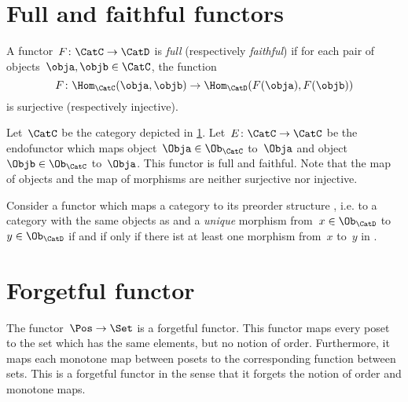 

\section{Full and faithful functors}
\begin{ctdefinition}
    \label{def:functorfullfaith}
    A functor~$F\colon \CatC \to \CatD$ is \emph{full} (respectively \emph{faithful}) if for each pair of objects~$\obja,\objb\in \CatC$, the function
    \begin{equation}
        F\colon \Hom_\CatC(\obja,\objb)\to \Hom_\CatD(F(\obja),F(\objb))
    \end{equation}
    is surjective (respectively injective).
\end{ctdefinition}

\begin{example}
    Let~$\CatC$ be the category depicted in \cref{fig:ex_full_faithful_1}. Let~$E\colon \CatC\to \CatC$ be the endofunctor which maps object~$\Obja\in \Ob_{\CatC}$ to~$\Obja$ and object~$\Objb\in \Ob_{\CatC}$ to~$\Obja$. This functor is full and faithful. Note that the map of objects and the map of morphisms are neither surjective nor injective.

    \begin{figure}[h!]
        \centering
        \caption{\label{fig:ex_full_faithful_1}}
    \end{figure}
\end{example}

\begin{example}
    Consider a functor which maps a category \CatC to its preorder structure \CatD, i.e. to a category with the same objects as \CatC and a \emph{unique} morphism from~$x\in \Ob_\CatD$ to~$y\in \Ob_\CatD$ if and if only if there ist at least one morphism from~$x$ to~$y$ in \CatC.
\end{example}


\section{Forgetful functor}


\begin{example}
    The functor~$\Pos \to \Set$ is a forgetful functor. This functor maps every poset to the set which has the same elements, but no notion of order. Furthermore, it maps each monotone map between posets to the corresponding function between sets. This is a forgetful functor in the sense that it forgets the notion of order and monotone maps.
\end{example}

